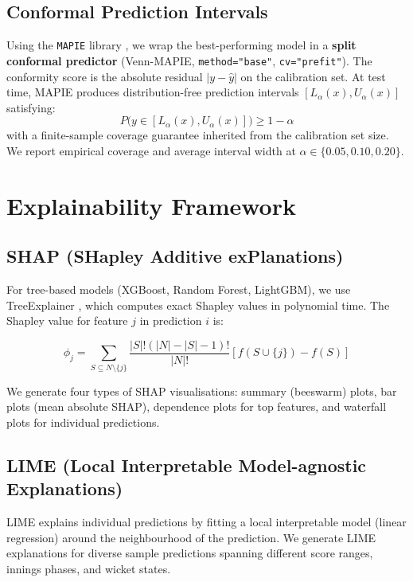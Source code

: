 \documentclass[12pt,a4paper,oneside]{report}
\begin{document}
\subsection{Conformal Prediction Intervals}

Using the \texttt{MAPIE} library \citep{taquet2022mapie}, we wrap the best-performing model in a \textbf{split conformal predictor} (Venn-MAPIE, \texttt{method="base"}, \texttt{cv="prefit"}).  The conformity score is the absolute residual $|y - \hat{y}|$ on the calibration set.  At test time, MAPIE produces distribution-free prediction intervals $[L_\alpha(x), U_\alpha(x)]$ satisfying:
\begin{equation}
P\bigl(y \in [L_\alpha(x), U_\alpha(x)]\bigr) \geq 1 - \alpha
\end{equation}
with a finite-sample coverage guarantee inherited from the calibration set size.  We report empirical coverage and average interval width at $\alpha \in \{0.05, 0.10, 0.20\}$.

\section{Explainability Framework}

\subsection{SHAP (SHapley Additive exPlanations)}

For tree-based models (XGBoost, Random Forest, LightGBM), we use TreeExplainer \citep{lundberg2020local}, which computes exact Shapley values in polynomial time. The Shapley value for feature $j$ in prediction $i$ is:

\begin{equation}
\phi_j = \sum_{S \subseteq N \setminus \{j\}} \frac{|S|!(|N|-|S|-1)!}{|N|!} \left[f(S \cup \{j\}) - f(S)\right]
\end{equation}

We generate four types of SHAP visualisations: summary (beeswarm) plots, bar plots (mean absolute SHAP), dependence plots for top features, and waterfall plots for individual predictions.

\subsection{LIME (Local Interpretable Model-agnostic Explanations)}

LIME \citep{ribeiro2016should} explains individual predictions by fitting a local interpretable model (linear regression) around the neighbourhood of the prediction. We generate LIME explanations for diverse sample predictions spanning different score ranges, innings phases, and wicket states.
\end{document}
